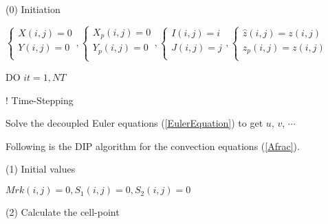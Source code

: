 \documentclass{article}
\theoremstyle{plain}\newtheorem{definition}{\sc{Definition}}
\theoremstyle{defination}\newtheorem{example}{Example}[section]
\numberwithin{equation}{section}
\numberwithin{table}{section}
\begin{document}
{\hspace{-0.48cm}
\normalsize
(0) Initiation 
\vspace{0.1cm}

\hspace{0.5cm}
  \scriptsize{\color{black!80}
  \hspace{-0.7cm}
  $
  \left\{
  \begin{array}{l}
	X(i,j)=0\\
	Y(i,j)=0\\
	\end{array}
	\right.
,
\left\{
  \begin{array}{l}
	X_p(i,j)=0\\
	Y_p(i,j)=0\\
	\end{array}
	\right.
,
\left\{
  \begin{array}{l}
	I(i,j)=i\\
	J(i,j)=j\\
	\end{array}
	\right.
,
\left\{
  \begin{array}{l}
	\hat{z}(i,j)=z(i,j)\\
	z_p(i,j)=z(i,j)\\
	\end{array}
	\right.
$

\vspace{0.1cm}
\hspace{-0.48cm}
{ \color{black!60!blue!80}DO}
\color{black!80} $it=1,NT$} {\color{black!60} \hspace{2.3cm} ! Time-Stepping
  \color{black}

  \small \hspace{-0.0cm}
\hspace{-0.18cm}
Solve the decoupled Euler equations (\ref{EulerEquation}) to get $u$, $v$, $\cdots$

\hspace{-0.10cm}
Following is the DIP  algorithm for the convection equations (\ref{Afrac}).
\vspace{0.2cm}

 \normalsize (1) Initial values
  \scriptsize
  { \color{black!80}  
  \vspace{0.1cm}

  \hspace{0.5cm}
$
Mrk(i,j)=0,
S_1(i,j)=0,
S_2(i,j)=0
$
\vspace{0.1cm}

\normalsize \color{black}
(2) Calculate the cell-point
 \scriptsize 
 \vspace{0.1cm}

}}}
\end{document}
